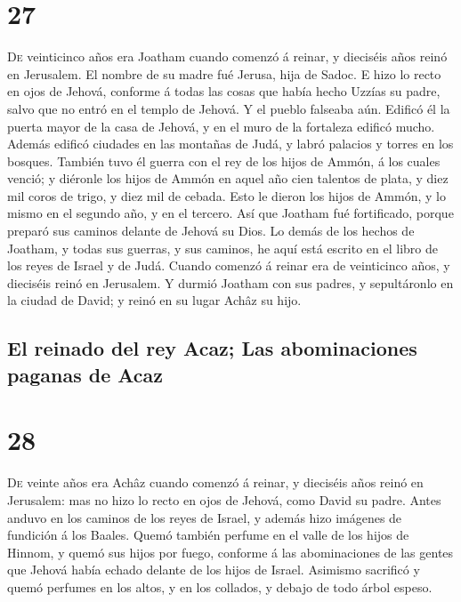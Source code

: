 \hypertarget{section-26}{%
\section{27}\label{section-26}}

 \textsc{De} veinticinco años era Joatham cuando comenzó á
reinar, y dieciséis años reinó en Jerusalem. El nombre de su madre fué
Jerusa, hija de Sadoc.  E hizo lo recto en ojos de Jehová,
conforme á todas las cosas que había hecho Uzzías su padre, salvo que no
entró en el templo de Jehová. Y el pueblo falseaba aún. 
Edificó él la puerta mayor de la casa de Jehová, y en el muro de la
fortaleza edificó mucho.  Además edificó ciudades en las
montañas de Judá, y labró palacios y torres en los bosques.
 También tuvo él guerra con el rey de los hijos de Ammón,
á los cuales venció; y diéronle los hijos de Ammón en aquel año cien
talentos de plata, y diez mil coros de trigo, y diez mil de cebada. Esto
le dieron los hijos de Ammón, y lo mismo en el segundo año, y en el
tercero.  Así que Joatham fué fortificado, porque preparó
sus caminos delante de Jehová su Dios.  Lo demás de los
hechos de Joatham, y todas sus guerras, y sus caminos, he aquí está
escrito en el libro de los reyes de Israel y de Judá. 
Cuando comenzó á reinar era de veinticinco años, y dieciséis reinó en
Jerusalem.  Y durmió Joatham con sus padres, y
sepultáronlo en la ciudad de David; y reinó en su lugar Achâz su hijo.

\hypertarget{el-reinado-del-rey-acaz-las-abominaciones-paganas-de-acaz}{%
\subsection{El reinado del rey Acaz; Las abominaciones paganas de
Acaz}\label{el-reinado-del-rey-acaz-las-abominaciones-paganas-de-acaz}}

\hypertarget{section-27}{%
\section{28}\label{section-27}}

 \textsc{De} veinte años era Achâz cuando comenzó á
reinar, y dieciséis años reinó en Jerusalem: mas no hizo lo recto en
ojos de Jehová, como David su padre.  Antes anduvo en los
caminos de los reyes de Israel, y además hizo imágenes de fundición á
los Baales.  Quemó también perfume en el valle de los
hijos de Hinnom, y quemó sus hijos por fuego, conforme á las
abominaciones de las gentes que Jehová había echado delante de los hijos
de Israel.  Asimismo sacrificó y quemó perfumes en los
altos, y en los collados, y debajo de todo árbol espeso.

